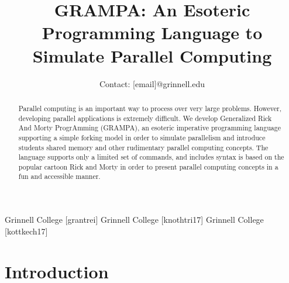 \documentclass[preprint]{sigplanconf}
\begin{document}
\setlength{\pdfpageheight}{\paperheight}
\setlength{\pdfpagewidth}{\paperwidth}

\allowdisplaybreaks



\title{GRAMPA: An Esoteric Programming Language to Simulate Parallel Computing}
\subtitle{Contact: [email]@grinnell.edu}

           {Grinnell College}
           {[grantrei]}
           {Grinnell College}
           {[knothtri17]}
           {Grinnell College}
           {[kottkech17]}

\maketitle

\begin{abstract}
Parallel computing is an important way to process over very large problems. However, developing parallel applications is extremely difficult. We develop Generalized Rick And Morty ProgrAmming (GRAMPA), an esoteric imperative programming language supporting a simple forking model in order to simulate parallelism and introduce students shared memory and other rudimentary parallel computing concepts. The language supports only a limited set of commands, and includes syntax is based on the popular cartoon Rick and Morty in order to present parallel computing concepts in a fun and accessible manner.
\end{abstract}

\section{Introduction}
\end{document}
